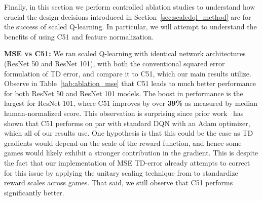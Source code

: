Finally, in this section we perform controlled ablation studies to understand how crucial the design decisions introduced in Section~\ref{sec:scaledql_method} are for the success of scaled Q-learning. In particular, we will attempt to understand the benefits of using C51 and feature normalization.

\textbf{MSE vs C51:} We ran scaled Q-learning with identical network architectures (ResNet 50 and ResNet 101), with both the conventional squared error formulation of TD error, and compare it to C51, which our main results utilize. Observe in Table~\ref{tab:ablation_mse} that C51 leads to much better performance for both ResNet 50 and ResNet 101 models. The boost in performance is the largest for ResNet 101, where C51 improves by over \textbf{39\%} as measured by median human-normalized score. This observation is surprising since prior work~\citep{agarwal2021deep} has shown that C51 performs on par with standard DQN with an Adam optimizer, which all of our results use. One hypothesis is that this could be the case as TD gradients would depend on the scale of the reward function, and hence some games would likely exhibit a stronger contribution in the gradient. This is despite the fact that our implementation of MSE TD-error already attempts to correct for this issue by applying the unitary scaling technique from \citep{kurin2022defense} to standardize reward scales across games. That said, we still observe that C51 performs significantly better.

\begin{table}[t]
    \centering
    \centering
    \vspace{-0.3cm}
    \caption{\footnotesize{\textbf{Performance of Scaled QL with the standard mean-squared TD-error and C51} in the offline 40-game setting aggregated by the median human-normalized score. Observe that for both ResNet 50 and ResNet 101, utilizing C51 leads to a drastic improvement in performance.}}%
    \label{tab:ablation_mse}
    \vspace{0.1cm}
\end{table}


